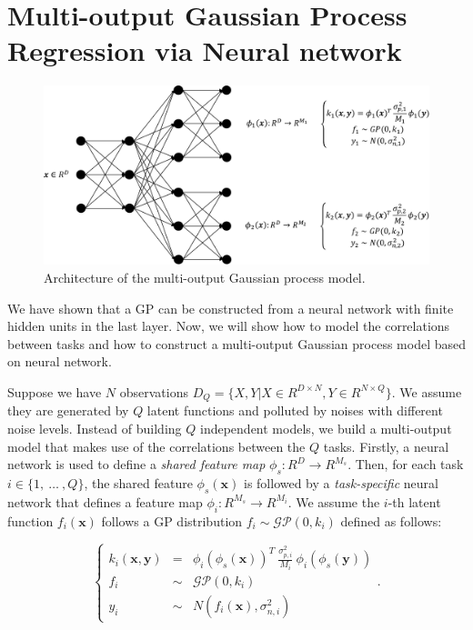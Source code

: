 \section{Multi-output Gaussian Process Regression via Neural network}\label{sec:mogp}

\begin{figure}[!htb]
    \centering
    \includegraphics[width=\columnwidth]{./img/nn2.pdf}
    \caption{Architecture of the multi-output Gaussian process model.}
    \label{fig:MONNGP}
\end{figure}

We have shown that a GP can be constructed from a neural network with finite hidden units in the last layer. Now, we will show how to model the correlations between tasks and how to construct a multi-output Gaussian process model based on neural network.

Suppose we have $N$ observations $D_Q = \{X, Y | X \in R^{D \times N}, Y \in R^{N \times Q}\}$. We assume they are generated by $Q$ latent functions and polluted by noises with different noise levels. Instead of building $Q$ independent models, we build a multi-output model that makes use of the correlations between the $Q$ tasks. Firstly, a neural network is used to define a \emph{shared feature map} $\phi_s : R^D \rightarrow R^{M_s}$. Then, for each task $i \in \{1,~\dots~,Q\}$, the shared feature $\phi_s(\bm{x})$ is followed by a \emph{task-specific} neural network that defines a feature map $\phi_i : R^{M_s} \rightarrow R^{M_i}$. We assume the $i$-th latent function $f_i(\bm{x})$ follows a GP distribution $f_i \sim \mathcal{GP}(0, k_i)$ defined as follows:

\begin{equation}
    \label{eq:mo_kernel}
    \left\{
    \begin{array}{lll}
        k_i(\bm{x}, \bm{y}) &=&    \phi_i(\phi_s(\bm{x}))^T~\frac{\sigma_{p, i}^2}{M_i}~\phi_i(\phi_s(\bm{y})) \\
        f_i                 &\sim& \mathcal{GP}(0, k_i)      \\
        y_i                 &\sim& N(f_i(\bm{x}), \sigma_{n, i}^2)
    \end{array}.
    \right.
\end{equation}

